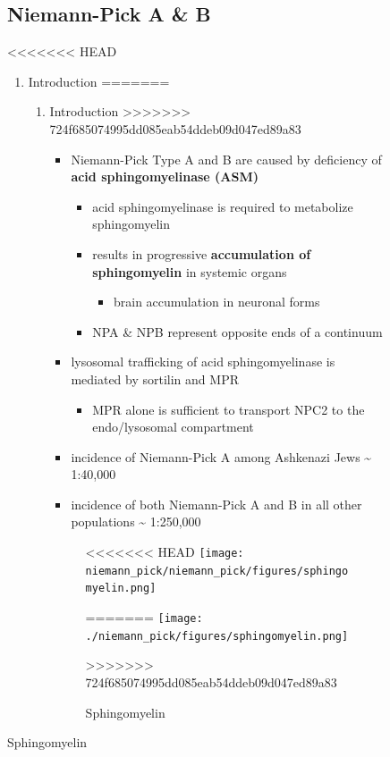 \documentclass[fontsize=12pt]{scrartcl}
\begin{document}
\begin{enumerate}
\begin{enumerate}
\begin{enumerate}
\begin{enumerate}
\begin{table}[htbp]
\begin{enumerate}
\begin{enumerate}
\begin{table}[htbp]
\begin{figure}[htbp]
\subsection{Niemann-Pick  A \& B}
<<<<<<< HEAD
\label{sec:org48fe6ec}
\begin{enumerate}
\item Introduction
\label{sec:org4e88d7a}
=======
\label{sec:org7effa1c}
\begin{enumerate}
\item Introduction
\label{sec:org38bd60d}
>>>>>>> 724f685074995dd085eab54ddeb09d047ed89a83
\begin{itemize}
\item Niemann-Pick Type A and B are caused by deficiency of \textbf{acid sphingomyelinase (ASM)}
\begin{itemize}
\item acid sphingomyelinase is required to metabolize sphingomyelin
\item results in progressive \textbf{accumulation of sphingomyelin} in systemic organs
\begin{itemize}
\item brain accumulation in neuronal forms
\end{itemize}
\item NPA \& NPB represent opposite ends of a continuum
\end{itemize}
\item lysosomal trafficking of acid sphingomyelinase is mediated by
sortilin and MPR
\begin{itemize}
\item MPR alone is sufficient to transport NPC2 to the endo/lysosomal compartment
\end{itemize}
\item incidence of Niemann-Pick A among Ashkenazi Jews \textasciitilde{} 1:40,000
\item incidence of both Niemann-Pick A and B in all other populations \textasciitilde{} 1:250,000
\end{itemize}

\begin{figure}[htbp]
\centering
<<<<<<< HEAD
\texttt{[image: niemann\_pick/niemann\_pick/figures/sphingomyelin.png]}
\caption{\label{fig:orgf48c30e}Sphingomyelin}
=======
\texttt{[image: ./niemann\_pick/figures/sphingomyelin.png]}
\caption{\label{fig:org4b95625}
Sphingomyelin}
>>>>>>> 724f685074995dd085eab54ddeb09d047ed89a83
\end{figure}


\end{enumerate}
\end{enumerate}
\end{figure}
\end{table}
\end{enumerate}
\end{enumerate}
\end{table}
\end{enumerate}
\end{enumerate}
\end{enumerate}
\end{enumerate}
\end{document}
